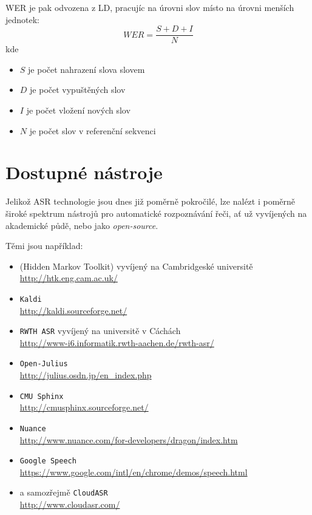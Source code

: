 WER je pak odvozena z LD, pracujíc na úrovni slov místo na úrovni menších jednotek:
%
\begin{equation}
	\label{eq:wer}
	WER = \frac{S+D+I}{N}
\end{equation}
%
kde
%
\begin{itemize}
\item $S$ je počet nahrazení slova slovem
\item $D$ je počet vypuštěných slov
\item $I$ je počet vložení nových slov
\item $N$ je počet slov v referenční sekvenci
\end{itemize}

\section{Dostupné nástroje}

Jelikož ASR technologie jsou dnes již poměrně pokročilé, lze nalézt i poměrně široké spektrum nástrojů pro automatické rozpoznávání řeči, ať už vyvíjených na akademické půdě, nebo jako {\sl open-source}.

Těmi jsou například:
\begin{itemize}
\item {} (Hidden Markov Toolkit) vyvíjený na Cambridgeské universitě \\ \url{http://htk.eng.cam.ac.uk/}
\item \verb|Kaldi| \\ \url{http://kaldi.sourceforge.net/}
\item \verb|RWTH ASR| vyvíjený na universitě v Cáchách \\ \url{http://www-i6.informatik.rwth-aachen.de/rwth-asr/}
\item \verb|Open-Julius| \\ \url{http://julius.osdn.jp/en_index.php}
\item \verb|CMU Sphinx| \\ \url{http://cmusphinx.sourceforge.net/}
\item \verb|Nuance| \\ \url{http://www.nuance.com/for-developers/dragon/index.htm}
\item \verb|Google Speech| \\ \url{https://www.google.com/intl/en/chrome/demos/speech.html}
\item a samozřejmě \verb|CloudASR| \\ \url{http://www.cloudasr.com/}
\end{itemize}